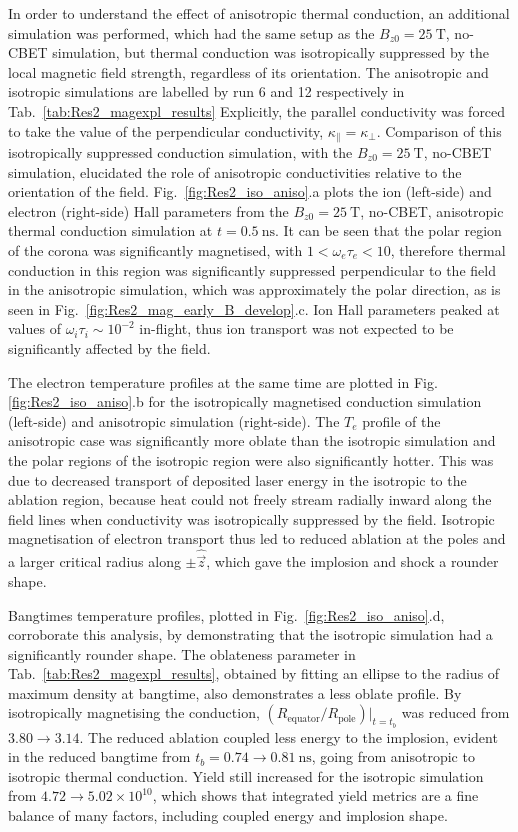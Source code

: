 In order to understand the effect of anisotropic thermal conduction, an additional simulation was performed, which had the same setup as the $B_{z0}=25\ \text{T}$, no-\ac{CBET} simulation, but thermal conduction was isotropically suppressed by the local magnetic field strength, regardless of its orientation.
The anisotropic and isotropic simulations are labelled by run 6 and 12 respectively in Tab.~\ref{tab:Res2_magexpl_results}
Explicitly, the parallel conductivity was forced to take the value of the perpendicular conductivity, $\kappa_{\parallel}=\kappa_{\perp}$.
Comparison of this isotropically suppressed conduction simulation, with the $B_{z0}=25\ \text{T}$, no-\ac{CBET} simulation, elucidated the role of anisotropic conductivities relative to the orientation of the field.
Fig.~\ref{fig:Res2_iso_aniso}.a plots the ion (left-side) and electron (right-side) Hall parameters from the $B_{z0}=25\ \text{T}$, no-\ac{CBET}, anisotropic thermal conduction simulation at $t=0.5\ \text{ns}$.
It can be seen that the polar region of the corona was significantly magnetised, with $1<\omega_e\tau_e<10$, therefore thermal conduction in this region was significantly suppressed perpendicular to the field in the anisotropic simulation, which was approximately the polar direction, as is seen in Fig.~\ref{fig:Res2_mag_early_B_develop}.c.
Ion Hall parameters peaked at values of  $\omega_i\tau_i\sim10^{-2}$ in-flight, thus ion transport was not expected to be significantly affected by the field.

The electron temperature profiles at the same time are plotted in Fig. \ref{fig:Res2_iso_aniso}.b for the isotropically magnetised conduction simulation (left-side) and anisotropic simulation (right-side).
The $T_e$ profile of the anisotropic case was significantly more oblate than the isotropic simulation and the polar regions of the isotropic region were also significantly hotter.
This was due to decreased transport of deposited laser energy in the isotropic to the ablation region, because heat could not freely stream radially inward along the field lines when conductivity was isotropically suppressed by the field.
Isotropic magnetisation of electron transport thus led to reduced ablation at the poles and a larger critical radius along $\pm\hat{\vec{z}}$, which gave the implosion and shock a rounder shape.

Bangtimes temperature profiles, plotted in Fig.~\ref{fig:Res2_iso_aniso}.d, corroborate this analysis, by demonstrating that the isotropic simulation had a significantly rounder shape.
The oblateness parameter in Tab.~\ref{tab:Res2_magexpl_results}, obtained by fitting an ellipse to the radius of maximum density at bangtime, also demonstrates a less oblate profile.
By isotropically magnetising the conduction, $(R_{\text{equator}}/R_{\text{pole}})|_{t=t_b}$ was reduced from $3.80\rightarrow3.14$.
The reduced ablation coupled less energy to the implosion, evident in the reduced bangtime from $t_b=0.74\rightarrow0.81\ \text{ns}$, going from anisotropic to isotropic thermal conduction.
Yield still increased for the isotropic simulation from $4.72\rightarrow5.02\times10^{10}$, which shows that integrated yield metrics are a fine balance of many factors, including coupled energy and implosion shape.

